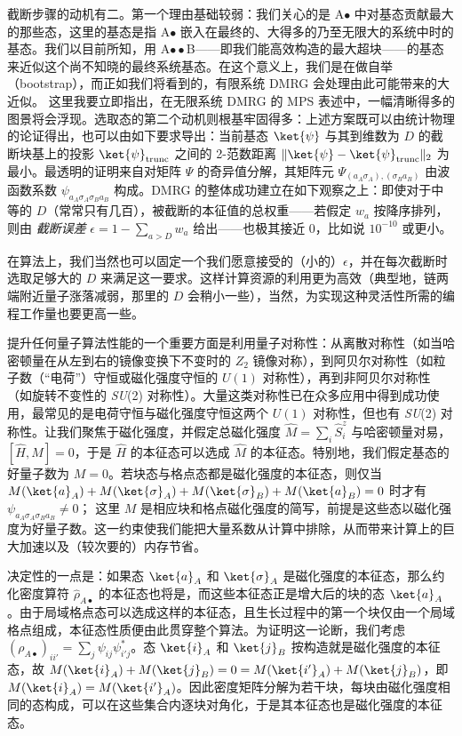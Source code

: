 截断步骤的动机有二。第一个理由基础较弱：我们关心的是 A$\bullet$ 中对基态贡献最大的那些态，这里的基态是指 A$\bullet$ 嵌入在最终的、大得多的乃至无限大的系统中时的基态。我们以目前所知，用 A$\bullet\bullet$B——即我们能高效构造的最大超块——的基态来近似这个尚不知晓的最终系统基态。在这个意义上，我们是在做自举（bootstrap），而正如我们将看到的，有限系统 DMRG 会处理由此可能带来的大近似。
这里我要立即指出，在无限系统 DMRG 的 MPS 表述中，一幅清晰得多的图景将会浮现。选取态的第二个动机则根基牢固得多：上述方案既可以由统计物理的论证得出，也可以由如下要求导出：当前基态 $\ket{\psi}$ 与其到维数为 $D$ 的截断块基上的投影 $\ket{\psi}_{{\rm trunc}}$ 之间的 2-范数距离 $\| \ket{\psi} - \ket{\psi}_{{\rm trunc}} \|_2$ 为最小。最透明的证明来自对矩阵 $\Psi$ 的奇异值分解，其矩阵元 $\Psi_{(a_A \sigma_A), (\sigma_B a_B)}$ 由波函数系数 $\psi_{a_A \sigma_A\sigma_B a_B}$ 构成。DMRG 的整体成功建立在如下观察之上：即使对于中等的 $D$（常常只有几百），被截断的本征值的总权重——若假定 $w_a$ 按降序排列，则由 {\em 截断误差} $\epsilon=1-\sum_{a>D} w_a$ 给出——也极其接近 0，比如说 $10^{-10}$ 或更小。

在算法上，我们当然也可以固定一个我们愿意接受的（小的）$\epsilon$，并在每次截断时选取足够大的 $D$ 来满足这一要求。这样计算资源的利用更为高效（典型地，链两端附近量子涨落减弱，那里的 $D$ 会稍小一些），当然，为实现这种灵活性所需的编程工作量也要更高一些。

提升任何量子算法性能的一个重要方面是利用量子对称性：从离散对称性（如当哈密顿量在从左到右的镜像变换下不变时的 $Z_2$ 镜像对称），到阿贝尔对称性（如粒子数（``电荷''）守恒或磁化强度守恒的 $U(1)$ 对称性），再到非阿贝尔对称性（如旋转不变性的 {\em SU}(2) 对称性）\cite{McCulloch07,SierraNishino97,McCulloch00,McCulloch01,McCulloch02}。大量这类对称性已在众多应用中得到成功使用，最常见的是电荷守恒与磁化强度守恒这两个 $U(1)$ 对称性，但也有 {\em SU}(2) 对称性\cite{McCulloch08a,Smerat09,Langer09,Holzner09}。让我们聚焦于磁化强度，并假定总磁化强度 $\hat{M} = \sum_i \hat{S}^z_i$ 与哈密顿量对易，$[\hat{H},\hat{M}]=0$，于是 $\hat{H}$ 的本征态可以选成 $\hat{M}$ 的本征态。特别地，我们假定基态的好量子数为 $M=0$。若块态与格点态都是磁化强度的本征态，则仅当 $M (\ket{a}_A) +  M (\ket{\sigma}_A) + M (\ket{\sigma}_B) + M (\ket{a}_B) = 0$ 时才有 $\psi_{a_A \sigma_A \sigma_B a_B} \neq 0$；
这里 $M$ 是相应块和格点磁化强度的简写，前提是这些态以磁化强度为好量子数。这一约束使我们能把大量系数从计算中排除，从而带来计算上的巨大加速以及（较次要的）内存节省。

决定性的一点是：如果态 $\ket{a}_A$ 和 $\ket{\sigma}_A$ 是磁化强度的本征态，那么约化密度算符 $\hat{\rho}_{A\bullet}$ 的本征态也将是，而这些本征态正是增大后的块的态 $\ket{a}_A$。由于局域格点态可以选成这样的本征态，且生长过程中的第一个块仅由一个局域格点组成，本征态性质便由此贯穿整个算法。为证明这一论断，我们考虑 $(\rho_{A\bullet})_{ii'} = \sum_j \psi_{ij} \psi^*_{i'j}$。态 $\ket{i}_A$ 和 $\ket{j}_B$ 按构造就是磁化强度的本征态，故
$M (\ket{i}_A) + M(\ket{j}_B) = 0 = M (\ket{i'}_A) + M (\ket{j}_B)$，即 $M (\ket{i}_A) = M (\ket{i'}_A)$。因此密度矩阵分解为若干块，每块由磁化强度相同的态构成，可以在这些集合内逐块对角化，于是其本征态也是磁化强度的本征态。


